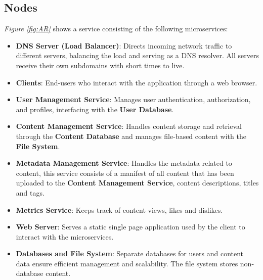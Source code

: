\documentclass[12pt]{article}
\begin{document}
\subsection{Nodes}

\textit{Figure \ref{fig:AR}} shows a service consisting of the following microservices:

\begin{itemize}
    \item \textbf{DNS Server (Load Balancer)}: Directs incoming network traffic to different servers, 
    balancing the load and serving as a DNS resolver. All servers receive their own subdomains 
    with short times to live.
    \item \textbf{Clients}: End-users who interact with the application through a web browser.
    \item \textbf{User Management Service}: Manages user authentication, authorization, and profiles, interfacing with the \textbf{User Database}.
    \item \textbf{Content Management Service}: Handles content storage and retrieval through the 
    \textbf{Content Database} and manages file-based content with the \textbf{File System}.
    \item \textbf{Metadata Management Service}: Handles the metadata related to content, 
    this service consists of a manifest of all content that has been uploaded to the \textbf{Content Management Service}, 
    content descriptions, titles and tags.
    \item \textbf{Metrics Service}: Keeps track of content views, likes and dislikes. 
    \item \textbf{Web Server}: Serves a static single page application used by the client to interact with the microservices.
    \item \textbf{Databases and File System}: Separate databases for users and content data ensure efficient management and scalability. 
    The file system stores non-database content.
\end{itemize}
\end{document}
